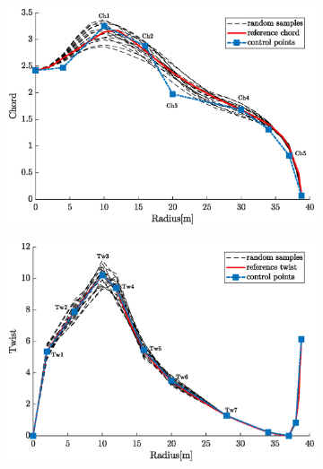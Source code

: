 \documentclass[11pt]{article}
\begin{document}
\begin{figure}[h!]
  \centering
  \begin{subfigure}[b]{0.4\linewidth}
    \includegraphics[width=\linewidth]{Chord_samples_torque.eps}
  \end{subfigure}
  \begin{subfigure}[b]{0.4\linewidth}
    \includegraphics[width=\linewidth]{Twist_samples_torque.eps}
  \end{subfigure}
  

\end{figure}
\end{document}
